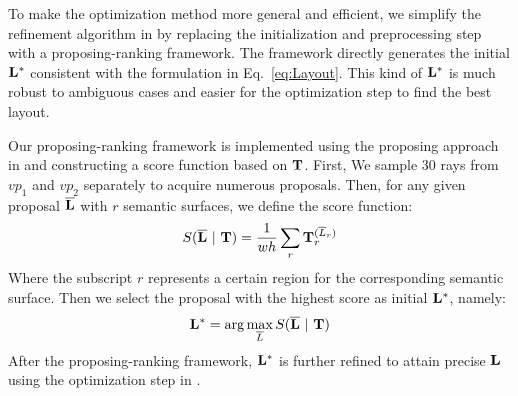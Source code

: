 To make the optimization method more general and efficient, we simplify the refinement algorithm in \cite{dasgupta2016delay} by replacing the initialization and preprocessing step with a proposing-ranking framework. The  framework directly generates the initial $\mathbf{L^*}$ consistent with the formulation in Eq.~\ref{eq:Layout}. This kind of $\mathbf{L^*}$ is much robust to ambiguous cases and easier for the optimization step to find the best layout.

Our proposing-ranking framework is implemented using the proposing approach in \cite{hedau2009recovering} and constructing a score function based on $\mathbf{T}$. First, We sample 30 rays from $vp_1$ and $vp_2$ separately to acquire numerous proposals. Then, for any given proposal $\mathbf{\overline{L}}$ with $r$ semantic surfaces, we define the score function:
%
\begin{equation}
\label{eq:scorefunction}
S(\mathbf{\overline{L}}~|~\mathbf{T}) = \frac{1}{wh}\sum_r \mathbf{T}_r^{(\overline{L}_r)}
\end{equation}
%
Where the subscript $r$ represents a certain region for the corresponding semantic surface. Then we select the proposal with the highest score as initial $\mathbf{L^*}$, namely:
%
\begin{equation}
\label{eq:initial}
\mathbf{L^*} = \arg\max_{\overline{L}} S(\mathbf{\overline{L}}~|~\mathbf{T})
\end{equation}
%
After the proposing-ranking framework, $\mathbf{L^*}$ is further refined to attain precise $\mathbf{L}$ using the optimization step in \cite{dasgupta2016delay}.


